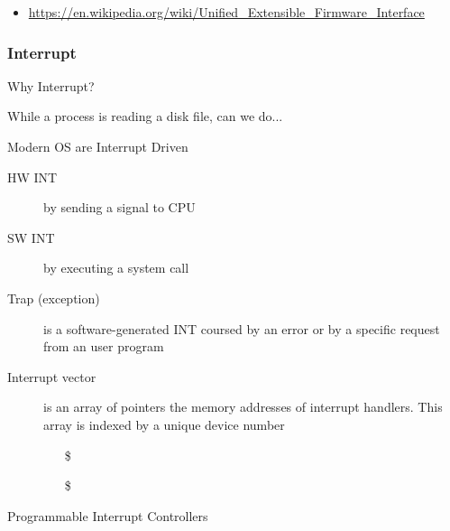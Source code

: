 \begin{itemize}
\item \url{https://en.wikipedia.org/wiki/Unified_Extensible_Firmware_Interface}
\end{itemize}

\subsubsection{Interrupt}
\label{sec:interrupt}

\begin{frame}{Why Interrupt?}
  \begin{block}{While a process is reading a disk file, can we do...}
    \begin{center}
    \end{center}
  \end{block}
\end{frame}

\begin{frame}{Modern OS are Interrupt Driven}
  \begin{description}
  \item[HW INT] by sending a signal to CPU
  \item[SW INT] by executing a \alert{system call}
  \item[Trap (exception)] is a software-generated INT coursed by an error or by a
    specific request from an user program
  \item[Interrupt vector] is an array of pointers {\pright} the memory addresses
    of \alert{interrupt handlers}. This array is indexed by a unique device number
    \begin{itemize}
    \item[\$] 
    \item[\$] 
    \end{itemize}
  \end{description}
\end{frame}

\begin{frame}{Programmable Interrupt Controllers}
  \begin{center}
  \end{center}
\end{frame}

